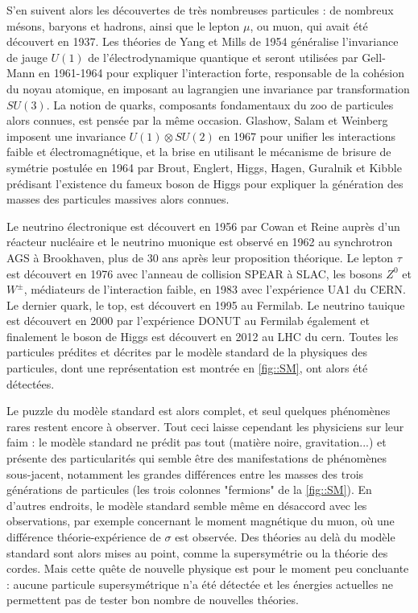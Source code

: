 		    S'en suivent alors les découvertes de très nombreuses particules : de nombreux mésons, baryons et  hadrons, ainsi que le lepton $\mu$, ou muon, qui avait été découvert en 1937\cite{Street1937}. Les théories de Yang et Mills de 1954\cite{Yang1954} généralise l'invariance de jauge $U(1)$ de l'électrodynamique quantique et seront utilisées par Gell-Mann en 1961-1964\cite{Glashow1961,Gell-Mann1964} pour expliquer l'interaction forte, responsable de la cohésion du noyau atomique, en imposant au lagrangien une invariance par transformation $SU(3)$. La notion de quarks, composants fondamentaux du zoo de particules alors connues, est pensée par la même occasion. Glashow, Salam et Weinberg imposent une invariance $U(1)\otimes SU(2)$ en 1967\cite{Glashow1961a,Salam1964,Weinberg1967} pour unifier les interactions faible et électromagnétique, et la brise en utilisant le mécanisme de brisure de symétrie postulée en 1964 par  Brout, Englert, Higgs, Hagen, Guralnik et Kibble\cite{Englert1964,Higgs1964,Higgs1964a,Kibble1967} prédisant l'existence du fameux boson de Higgs pour expliquer la génération des masses des particules massives alors connues. 
		    
		    Le neutrino électronique est découvert en 1956 par Cowan et Reine\cite{Cowan1956} auprès d'un réacteur nucléaire et le neutrino muonique est observé en 1962\cite{Danby1962} au synchrotron AGS à Brookhaven, plus de 30 ans après leur proposition théorique. Le lepton $\tau$ est découvert en 1976\cite{Perl1975} avec l'anneau de collision SPEAR à SLAC, les bosons $Z^0$ et $W^{\pm}$, médiateurs de l'interaction faible, en 1983\cite{Arnison1983,Arnison1983a} avec l'expérience UA1 du CERN. Le dernier quark, le top, est découvert en 1995\cite{Collaboration1995} au Fermilab. Le neutrino tauique est découvert en 2000 par l'expérience DONUT\cite{Collaboration2000} au Fermilab également et finalement le boson de Higgs est découvert en 2012 au LHC du \gls{cern}\cite{Collaboration2012}. Toutes les particules prédites et décrites par le modèle standard de la physiques des particules, dont une représentation est montrée en \autoref{fig::SM}, ont alors été détectées. 
		    
		    Le puzzle du modèle standard est alors complet, et seul quelques phénomènes rares restent encore à observer. Tout ceci laisse cependant les physiciens sur leur faim : le modèle standard ne prédit pas tout (matière noire, gravitation...) et présente des particularités qui semble être des manifestations de phénomènes sous-jacent, notamment les grandes différences entre les masses des trois générations de particules (les trois colonnes "fermions" de la \autoref{fig::SM}). En d'autres endroits, le modèle standard semble même en désaccord avec les observations, par exemple concernant le moment magnétique du muon, où une différence théorie-expérience de $\sigma$ est observée\cite{pdg2018}. Des théories au delà du modèle standard sont alors mises au point, comme la supersymétrie ou la théorie des cordes\cite{pdg2018}. Mais cette quête de nouvelle physique est pour le moment peu concluante : aucune particule supersymétrique n'a été détectée et les énergies actuelles ne permettent pas de tester bon nombre de nouvelles théories.
		    
